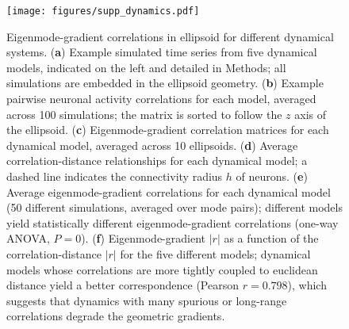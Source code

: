 \documentclass{article}
\begin{document}
\newpage

\begin{figure}[t]
    \centering
    \texttt{[image: figures/supp\_dynamics.pdf]}
    \caption{Eigenmode-gradient correlations in ellipsoid for different dynamical systems. (\textbf{a}) Example simulated time series from five dynamical models, indicated on the left and detailed in Methods; all simulations are embedded in the ellipsoid geometry. (\textbf{b}) Example pairwise neuronal activity correlations for each model, averaged across 100 simulations; the matrix is sorted to follow the $z$ axis of the ellipsoid. (\textbf{c}) Eigenmode-gradient correlation matrices for each dynamical model, averaged across 10 ellipsoids. (\textbf{d}) Average correlation-distance relationships for each dynamical model; a dashed line indicates the connectivity radius $h$ of neurons. (\textbf{e}) Average eigenmode-gradient correlations for each dynamical model (50 different simulations, averaged over mode pairs); different models yield statistically different eigenmode-gradient correlations (one-way ANOVA, $P=0$). (\textbf{f}) Eigenmode-gradient $|r|$ as a function of the correlation-distance $|r|$ for the five different models; dynamical models whose correlations are more tightly coupled to euclidean distance yield a better correspondence (Pearson $r=0.798$), which suggests that dynamics with many spurious or long-range correlations degrade the geometric gradients. }
    \label{supp_dynamics}
\end{figure}

\newpage
\end{document}
